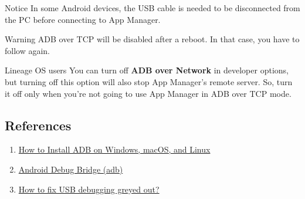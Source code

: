 \begin{tip}{Notice}
    In some Android devices, the USB cable is needed to be disconnected from the PC before connecting to App Manager.
\end{tip}

\begin{warning}{Warning}
    ADB over TCP will be disabled after a reboot. In that case, you have to follow  again.
\end{warning}

\begin{warning}{Lineage OS users}
    You can turn off \textbf{ADB over Network} in developer options, but turning off this option will also stop App
    Manager's remote server. So, turn it off only when you're not going to use App Manager in ADB over TCP mode.
\end{warning}

\subsection{References}\label{subsec:references} %
\begin{enumerate}
    \item \href{https://www.xda-developers.com/install-adb-windows-macos-linux}{How to Install ADB on Windows, macOS, and Linux}
    \item \href{https://developer.android.com/studio/command-line/adb}{Android Debug Bridge (adb)}
    \item \href{https://www.syncios.com/android/fix-usb-debugging-grey-out.html}{How to fix USB debugging greyed out?}
\end{enumerate}

